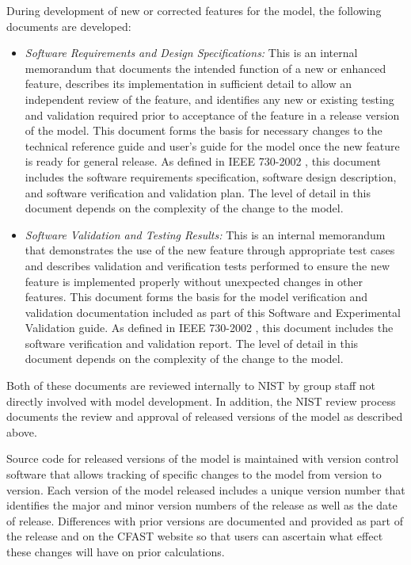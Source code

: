 During development of new or corrected features for the model, the following documents are developed:

\begin{itemize}
\item {\em Software Requirements and Design Specifications:}  This is an internal memorandum that documents the intended function of a new or enhanced feature, describes its implementation in sufficient detail to allow an independent review of the feature, and identifies any new or existing testing and validation required prior to acceptance of the feature in a release version of the model.  This document forms the basis for necessary changes to the technical reference guide and user's guide for the model once the new feature is ready for general release. As defined in IEEE 730-2002 \cite{IEEE:730}, this document includes the software requirements specification, software design description, and software verification and validation plan. The level of detail in this document depends on the complexity of the change to the model. 

\item {\em Software Validation and Testing Results:}  This is an internal memorandum that demonstrates the use of the new feature through appropriate test cases and describes validation and verification tests performed to ensure the new feature is implemented properly without unexpected changes in other features. This document forms the basis for the model verification and validation documentation included as part of this Software and Experimental Validation guide. As defined in IEEE 730-2002 \cite{IEEE:730}, this document includes the software verification and validation report. The level of detail in this document depends on the complexity of the change to the model.
\end{itemize}

Both of these documents are reviewed internally to NIST by group staff not directly involved with model development. In addition, the NIST review process documents the review and approval of released versions of the model as described above.

Source code for released versions of the model is maintained with version control software that allows tracking of specific changes to the model from version to version.   Each version of the model released includes a unique version number that identifies the major and minor version numbers of the release as well as the date of release. Differences with prior versions are documented and provided as part of the release and on the CFAST website so that users can ascertain what effect these changes will have on prior calculations.

